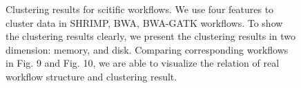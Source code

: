 \documentclass[conference]{IEEEtran}
\begin{document}
\begin{figure}[t]
  \centering 
  \caption{Clustering results for scitific workflows. We use four features to cluster data in SHRIMP, BWA, BWA-GATK workflows. To show the clustering results clearly, we present the clustering results in two dimension: memory, and disk. Comparing corresponding workflows in Fig. 9 and Fig. 10, we are able to visualize the relation of real workflow structure and clustering result.} 
\end{figure}
\end{document}
